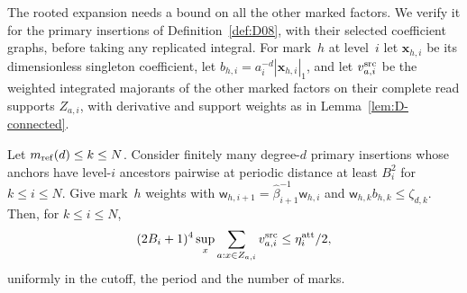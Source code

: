 The rooted expansion needs a bound on all the other marked factors. We verify it for the primary insertions of Definition~\ref{def:D08}, with their selected coefficient graphs, before taking any replicated integral. For mark~$h$ at level~$i$ let $\mathbf x_{h,i}$ be its dimensionless singleton coefficient, let $b_{h,i}=a_i^{-d}|\mathbf x_{h,i}|_1$, and let $v_{a,i}^{\rm src}$ be the weighted integrated majorants of the other marked factors on their complete read supports $Z_{a,i}$, with derivative and support weights as in Lemma~\ref{lem:D-connected}.
\begin{lemma}\label{lem:E-source-attachments}
Let $m_{\mathrm{ref}}(d)\le k\le N$. Consider finitely many degree-$d$ primary insertions whose anchors have level-$i$ ancestors pairwise at periodic distance at least $B_i^2$ for $k\le i\le N$. Give mark~$h$ weights with $\mathsf w_{h,i+1}=\widehat\beta_{i+1}^{-1}\mathsf w_{h,i}$ and $\mathsf w_{h,k}b_{h,k}\le\zeta_{d,k}$. Then, for $k\le i\le N$,
\begin{equation*}
 (2B_i+1)^4\sup_x\sum_{a:x\in Z_{a,i}}v_{a,i}^{\rm src}\le\eta^{\rm att}_i/2,
\end{equation*}
uniformly in the cutoff, the period and the number of marks.
\end{lemma}
